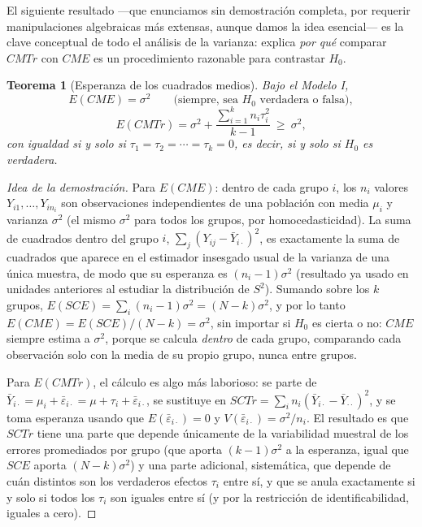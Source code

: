 \documentclass[11pt,a4paper]{article}
\theoremstyle{plain}
\newtheorem{teorema}{Teorema}[section]
\theoremstyle{definition}
\theoremstyle{remark}
\begin{document}
El siguiente resultado —que enunciamos sin demostración completa, por requerir manipulaciones algebraicas más extensas, aunque damos la idea esencial— es la clave conceptual de todo el análisis de la varianza: explica \emph{por qué} comparar $CMTr$ con $CME$ es un procedimiento razonable para contrastar $H_0$.

\begin{teorema}[Esperanza de los cuadrados medios]
Bajo el Modelo I,
\[
E(CME) = \sigma^2 \qquad \text{(siempre, sea $H_0$ verdadera o falsa)},
\]
\[
E(CMTr) = \sigma^2 + \frac{\sum_{i=1}^k n_i\tau_i^2}{k-1} \ \geq\ \sigma^2,
\]
con igualdad si y solo si $\tau_1=\tau_2=\cdots=\tau_k=0$, es decir, si y solo si $H_0$ es verdadera.
\end{teorema}

\begin{proof}[Idea de la demostración]
Para $E(CME)$: dentro de cada grupo $i$, los $n_i$ valores $Y_{i1},\dots,Y_{in_i}$ son observaciones independientes de una población con media $\mu_i$ y varianza $\sigma^2$ (el mismo $\sigma^2$ para todos los grupos, por homocedasticidad). La suma de cuadrados dentro del grupo $i$, $\sum_j(Y_{ij}-\bar Y_{i\cdot})^2$, es exactamente la suma de cuadrados que aparece en el estimador insesgado usual de la varianza de una única muestra, de modo que su esperanza es $(n_i-1)\sigma^2$ (resultado ya usado en unidades anteriores al estudiar la distribución de $S^2$). Sumando sobre los $k$ grupos, $E(SCE)=\sum_i(n_i-1)\sigma^2=(N-k)\sigma^2$, y por lo tanto $E(CME)=E(SCE)/(N-k)=\sigma^2$, sin importar si $H_0$ es cierta o no: $CME$ siempre estima a $\sigma^2$, porque se calcula \emph{dentro} de cada grupo, comparando cada observación solo con la media de su propio grupo, nunca entre grupos.

Para $E(CMTr)$, el cálculo es algo más laborioso: se parte de $\bar Y_{i\cdot}=\mu_i+\bar\varepsilon_{i\cdot}=\mu+\tau_i+\bar\varepsilon_{i\cdot}$, se sustituye en $SCTr=\sum_in_i(\bar Y_{i\cdot}-\bar Y_{\cdot\cdot})^2$, y se toma esperanza usando que $E(\bar\varepsilon_{i\cdot})=0$ y $V(\bar\varepsilon_{i\cdot})=\sigma^2/n_i$. El resultado es que $SCTr$ tiene una parte que depende únicamente de la variabilidad muestral de los errores promediados por grupo (que aporta $(k-1)\sigma^2$ a la esperanza, igual que $SCE$ aporta $(N-k)\sigma^2$) y una parte adicional, sistemática, que depende de cuán distintos son los verdaderos efectos $\tau_i$ entre sí, y que se anula exactamente si y solo si todos los $\tau_i$ son iguales entre sí (y por la restricción de identificabilidad, iguales a cero).
\end{proof}
\end{document}
